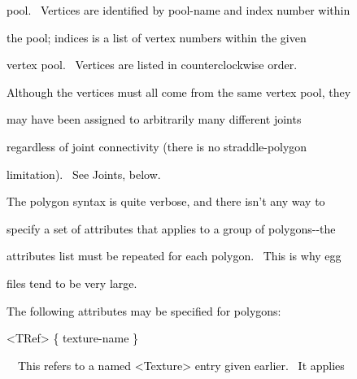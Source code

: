 \documentclass[a4paper]{article}
\newcommand\textstyleOOoComputerKeyWord[1]{\textrm{\textcolor[rgb]{0.0,0.0,0.5019608}{#1}}}
\begin{document}
{\color{black}
\textstyleOOoComputerKeyWord{\textcolor{black}{\ \ pool. \ Vertices are identified by pool-name and index number
within}}}

{\color{black}
\textstyleOOoComputerKeyWord{\textcolor{black}{\ \ the pool; indices is a list of vertex numbers within the given}}}

{\color{black}
\textstyleOOoComputerKeyWord{\textcolor{black}{\ \ vertex pool. \ Vertices are listed in counterclockwise order.}}}

{\color{black}
\textstyleOOoComputerKeyWord{\textcolor{black}{\ \ Although the vertices must all come from the same vertex pool,
they}}}

{\color{black}
\textstyleOOoComputerKeyWord{\textcolor{black}{\ \ may have been assigned to arbitrarily many different joints}}}

{\color{black}
\textstyleOOoComputerKeyWord{\textcolor{black}{\ \ regardless of joint connectivity (there is no
{\textquotedbl}straddle-polygon{\textquotedbl}}}}

{\color{black}
\textstyleOOoComputerKeyWord{\textcolor{black}{\ \ limitation). \ See Joints, below.}}}


\bigskip

{\color{black}
\textstyleOOoComputerKeyWord{\textcolor{black}{\ \ The polygon syntax is quite verbose, and there isn't any way to}}}

{\color{black}
\textstyleOOoComputerKeyWord{\textcolor{black}{\ \ specify a set of attributes that applies to a group of
polygons-{}-the}}}

{\color{black}
\textstyleOOoComputerKeyWord{\textcolor{black}{\ \ attributes list must be repeated for each polygon. \ This is why
egg}}}

{\color{black}
\textstyleOOoComputerKeyWord{\textcolor{black}{\ \ files tend to be very large.}}}


\bigskip

{\color{black}
\textstyleOOoComputerKeyWord{\textcolor{black}{\ \ The following attributes may be specified for polygons:}}}


\bigskip

{\color{black}
\textstyleOOoComputerKeyWord{\textcolor{black}{\ \ {\textless}TRef{\textgreater} \{ texture-name \}}}}


\bigskip

{\color{black}
\textstyleOOoComputerKeyWord{\textcolor{black}{\ \ \ \ This refers to a named {\textless}Texture{\textgreater} entry
given earlier. \ It applies}}}
\end{document}
